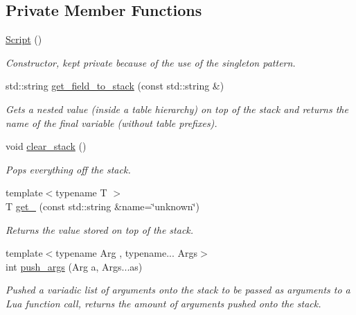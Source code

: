 \subsection*{Private Member Functions}
\begin{DoxyCompactItemize}
\item 
\hyperlink{classlpp_1_1_script_a5c7d3ac74a426de91e77b1f3791fda1e}{Script} ()
\begin{DoxyCompactList}\small\item\em Constructor, kept private because of the use of the singleton pattern. \end{DoxyCompactList}\item 
std\+::string \hyperlink{classlpp_1_1_script_af6fcf9309891444f435df96667c51a95}{get\+\_\+field\+\_\+to\+\_\+stack} (const std\+::string \&)
\begin{DoxyCompactList}\small\item\em Gets a nested value (inside a table hierarchy) on top of the stack and returns the name of the final variable (without table prefixes). \end{DoxyCompactList}\item 
void \hyperlink{classlpp_1_1_script_a96d4cb098566a4390d764cee2d7d0b70}{clear\+\_\+stack} ()
\begin{DoxyCompactList}\small\item\em Pops everything off the stack. \end{DoxyCompactList}\item 
{\footnotesize template$<$typename T $>$ }\\T \hyperlink{classlpp_1_1_script_a90226739c06be4b6665bc529a08636fa}{get\+\_\+} (const std\+::string \&name=\char`\"{}unknown\char`\"{})
\begin{DoxyCompactList}\small\item\em Returns the value stored on top of the stack. \end{DoxyCompactList}\item 
{\footnotesize template$<$typename Arg , typename... Args$>$ }\\int \hyperlink{classlpp_1_1_script_ae9a31ab88caf85834a400cd080bc55ec}{push\+\_\+args} (Arg a, Args...\+as)
\begin{DoxyCompactList}\small\item\em Pushed a variadic list of arguments onto the stack to be passed as arguments to a Lua function call, returns the amount of arguments pushed onto the stack. \end{DoxyCompactList}\item 

\end{DoxyCompactItemize}
